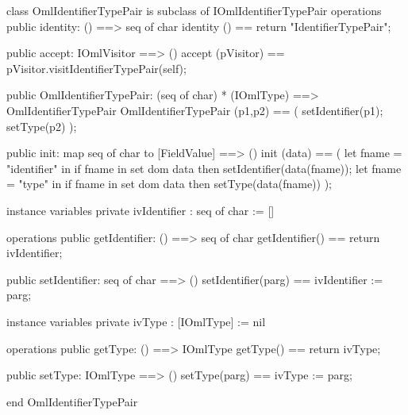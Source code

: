 \begin{vdm_al}
class OmlIdentifierTypePair is subclass of IOmlIdentifierTypePair
operations
  public identity: () ==> seq of char
  identity () == return "IdentifierTypePair";

  public accept: IOmlVisitor ==> ()
  accept (pVisitor) == pVisitor.visitIdentifierTypePair(self);

  public OmlIdentifierTypePair:
      (seq of char) *
      (IOmlType) ==> OmlIdentifierTypePair
  OmlIdentifierTypePair (p1,p2) == 
   ( setIdentifier(p1);
     setType(p2) );

  public init: map seq of char to [FieldValue] ==> ()
  init (data) ==
    ( let fname = "identifier" in
        if fname in set dom data
        then setIdentifier(data(fname));
      let fname = "type" in
        if fname in set dom data
        then setType(data(fname)) );

instance variables
  private ivIdentifier : seq of char := []

operations
  public getIdentifier: () ==> seq of char
  getIdentifier() == return ivIdentifier;

  public setIdentifier: seq of char ==> ()
  setIdentifier(parg) == ivIdentifier := parg;

instance variables
  private ivType : [IOmlType] := nil

operations
  public getType: () ==> IOmlType
  getType() == return ivType;

  public setType: IOmlType ==> ()
  setType(parg) == ivType := parg;

end OmlIdentifierTypePair
\end{vdm_al}

